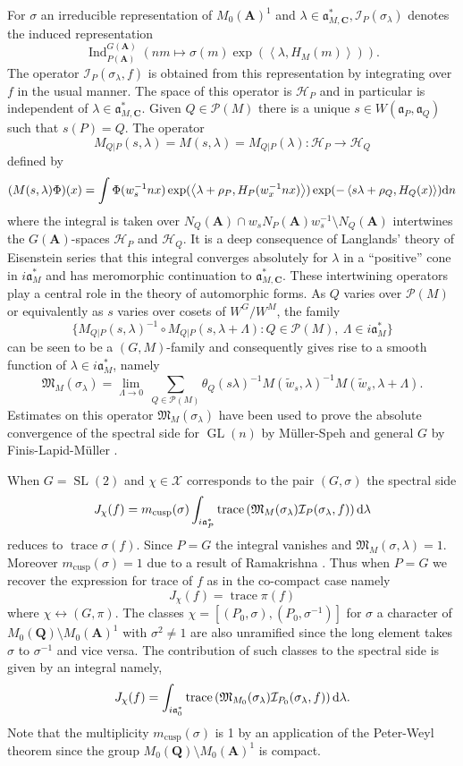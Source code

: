 \documentclass[11pt]{amsart}
\def\A{\mathbf A}
\def\C{\mathbf C}
\def\Q{\mathbf Q}
\def\HHH{\mathcal H}
\def\III{\mathcal I}
\def\MMM{\mathfrak M}	%
\def\PPP{\mathcal P}
\def\XXX{\mathcal X}
\def\aaa{\mathfrak a}
\def\d{\text d}
\def\bs{\setminus}
\def\gl{\operatorname{GL}}
\def\Ind{\operatorname{Ind}}
\def\sl{\operatorname{SL}}
\def\sprod#1#2{\left\langle #1 , #2 \right\rangle}  %
\def\trace{\operatorname{trace}}
\theoremstyle{remark}
\begin{document}
For $\sigma$ an irreducible representation of $M_0(\A)^1$ and $\lambda \in \aaa_{M, \C}^*, \III_P(\sigma_\lambda)$ denotes the induced representation
\[ \Ind_{P(\A)}^{G(\A)} \left( nm \mapsto \sigma(m) \exp(\sprod{\lambda}{H_M(m)}) \right). \]
The operator $\III_P(\sigma_\lambda, f)$ is obtained from this representation by integrating over $f$ in the usual manner. The space of this operator is $\HHH_P$ and in particular is independent of $\lambda \in \aaa_{M, \C}^*$. Given $Q \in \PPP(M)$ there is a unique $s \in W(\aaa_P, \aaa_Q)$ such that $s(P) = Q$. The operator
\[ M_{Q|P}(s, \lambda) = M(s, \lambda) = M_{Q|P}(\lambda): \HHH_P \to \HHH_Q \]
defined by
\[ (M(s, \lambda)\Phi)(x) = \int \Phi(w_s^{-1}nx) \exp(\sprod{\lambda + \rho_P}{H_P(w_x^{-1}nx)}) 
		\exp(-\sprod{s\lambda + \rho_Q}{H_Q(x)}) \d n \]
where the integral is taken over $N_Q(\A) \cap w_s N_P(\A) w_s^{-1} \bs N_Q(\A)$ intertwines the $G(\A)$-spaces $\HHH_P$ and $\HHH_Q$. It is a deep consequence of Langlands' theory of Eisenstein series that this integral converges absolutely for $\lambda$ in a ``positive'' cone in $i\aaa_M^*$ and has meromorphic continuation to $\aaa_{M, \C}^*$. These intertwining operators play a central role in the theory of automorphic forms. As $Q$ varies over $\PPP(M)$ or equivalently as $s$ varies over cosets of $W^G/W^M$, the family
\[ \{ M_{Q|P}(s, \lambda)^{-1} \circ M_{Q|P}(s, \lambda + \Lambda) : Q \in \PPP(M), \ \Lambda \in i\aaa_M^* \} \]
can be seen to be a $(G, M)$-family and consequently gives rise to a smooth function of $\lambda \in i\aaa_M^*$, namely
\[ \MMM_M(\sigma_\lambda) = \lim_{\Lambda \to 0} \ \sum_{Q \in \PPP(M)} \theta_Q(s\lambda)^{-1} M(\tilde w_s, \lambda)^{-1} M(\tilde w_s, \lambda + \Lambda). \]
Estimates on this operator $\MMM_M(\sigma_\lambda)$ have been used to prove the absolute convergence of the spectral side for $\gl(n)$ by M{\"u}ller-Speh \cite{MS} and general $G$ by Finis-Lapid-M{\"u}ller \cite{FLM}.

When $G = \sl(2)$ and $\chi \in \XXX$ corresponds to the pair $(G, \sigma)$ the spectral side
\[ J_\chi(f) = m_{\text{cusp}}(\sigma) \int_{i\aaa_P^*} \trace\left(\MMM_M(\sigma_\lambda) \III_P(\sigma_\lambda, f)\right) \d \lambda \]
reduces to $\trace \sigma(f)$. Since $P=G$ the integral vanishes and $\MMM_M(\sigma, \lambda) = 1$. Moreover $m_\text{cusp} (\sigma) = 1$ due to a result of Ramakrishna \cite{MR1792292}. Thus when $P=G$ we recover the expression for trace of $f$ as in the co-compact case namely
\[ J_\chi(f) = \trace \pi(f) \]
where $\chi \leftrightarrow (G, \pi)$. The classes $\chi = [(P_0, \sigma), (P_0, \sigma^{-1})]$ for $\sigma$ a character of $M_0(\Q) \bs M_0(\A)^1$ with $\sigma^2 \neq 1$ are also unramified since the long element takes $\sigma$ to $\sigma^{-1}$ and vice versa. The contribution of such classes to the spectral side is given by an integral namely,
\[ J_\chi(f) = \int_{i\aaa_0^*} \trace\left( \MMM_{M_0}(\sigma_\lambda) \III_{P_0}(\sigma_\lambda, f) \right) \d \lambda. \]
Note that the multiplicity $m_{\text{cusp}}(\sigma)$ is 1 by an application of the Peter-Weyl theorem since the group $M_0(\Q)\bs M_0(\A)^1$ is compact. 
\end{document}
